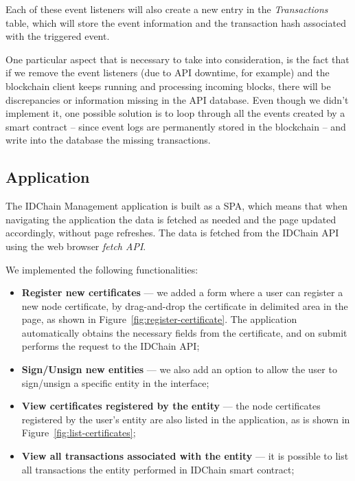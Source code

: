 Each of these event listeners will also create a new entry in the \textit{Transactions} table, which will store the event information and the transaction hash associated with the triggered event.

One particular aspect that is necessary to take into consideration, is the fact that if we remove the event listeners (due to API downtime, for example) and the blockchain client keeps running and processing incoming blocks, there will be discrepancies or information missing in the API database.
Even though we didn't implement it, one possible solution is to loop through all the events created by a smart contract – since event logs are permanently stored in the blockchain – and write into the database the missing transactions.

\subsection{Application}\label{subsection:mapp}

The IDChain Management application is built as a \ac{SPA}, which means that when navigating the application the data is fetched as needed and the page updated accordingly, without page refreshes.
The data is fetched from the IDChain API using the web browser \textit{fetch API}.

We implemented the following functionalities:
\begin{itemize}
  \item \textbf{Register new certificates} — we added a form where a user can register a new node certificate, by drag-and-drop the certificate in delimited area in the page, as shown in Figure~\ref{fig:register-certificate}. The application automatically obtains the necessary fields from the certificate, and on submit performs the request to the IDChain API;
  \item \textbf{Sign/Unsign new entities} — we also add an option to allow the user to sign/unsign a specific entity in the interface;
  \item \textbf{View certificates registered by the entity} — the node certificates registered by the user's entity are also listed in the application, as is shown in Figure~\ref{fig:list-certificates};
  \item \textbf{View all transactions associated with the entity} — it is possible to list all transactions the entity performed in IDChain smart contract;
\end{itemize}

